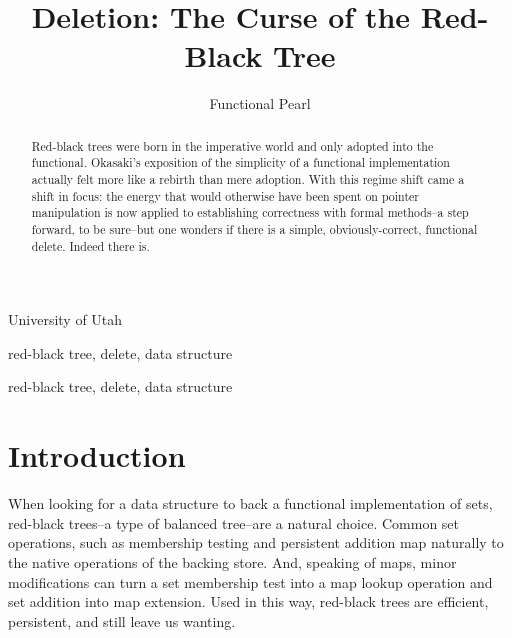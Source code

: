 \documentclass[preprint]{sigplanconf}
\begin{document}
\copyrightdata{[to be supplied]} 


\title{Deletion: The Curse of the Red-Black Tree}
\subtitle{Functional Pearl}

           {University of Utah}

\maketitle

\begin{abstract}
Red-black trees were born in the imperative world and only adopted into the functional. Okasaki's exposition of the simplicity of a functional implementation actually felt more like a rebirth than mere adoption. With this regime shift came a shift in focus: the energy that would otherwise have been spent on pointer manipulation is now applied to establishing correctness with formal methods--a step forward, to be sure--but one wonders if there is a simple, obviously-correct, functional delete. Indeed there is.
\end{abstract}


\terms
red-black tree, delete, data structure

\keywords
red-black tree, delete, data structure

\section{Introduction}

When looking for a data structure to back a functional implementation of sets, red-black trees--a type of balanced tree--are a natural choice. Common set operations, such as membership testing and persistent addition map naturally to the native operations of the backing store. And, speaking of maps, minor modifications can turn a set membership test into a map lookup operation and set addition into map extension. Used in this way, red-black trees are efficient, persistent, and still leave us wanting.
\end{document}

